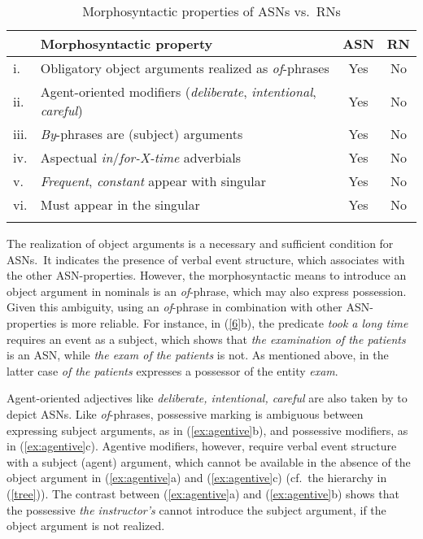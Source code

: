 \documentclass[output=paper]{langsci/langscibook}
\begin{document}
\begin{table}
\caption{Morphosyntactic properties of ASNs vs.\ RNs\label{tab:1:ASN:RN}}
\begin{tabular}{llcc}
\lsptoprule
& Morphosyntactic property & ASN & RN\\\midrule
i. & Obligatory object arguments realized as \textit{of}-phrases & Yes & No \\ 
ii. & Agent-oriented modifiers (\textit{deliberate}, \textit{intentional}, \textit{careful}) & Yes & No\\ 
iii. & \textit{By}-phrases are (subject) arguments &Yes & No\\ 
iv. & Aspectual \textit{in}/\textit{for-X-time} adverbials & Yes & No\\ 
v. &  \textit{Frequent}, \textit{constant} appear with singular & Yes & No\\ 
vi. & Must appear in the singular & Yes & No\\
\lspbottomrule
\end{tabular}
\end{table}

 The realization of object arguments is a necessary and sufficient condition for ASNs.\ It indicates the presence of verbal event structure, which associates with the other ASN-properties. However, the morphosyntactic means to introduce an object argument in nominals is an \textit{of}-phrase, which may also express possession. Given this ambiguity, using an  \textit{of}-phrase in combination with other ASN-properties is more reliable. For instance, in  (\ref{6}b), the predicate \textit{took a long time} requires an event as a subject, which shows that \textit{the examination of the patients} is an ASN, while \textit{the exam of the patients} is not.
As mentioned above, in the latter case \textit{of the patients} expresses a possessor of the entity \textit{exam}.

Agent-oriented adjectives like \textit{deliberate, intentional, careful} are also taken by \citet[51--52]{grimshaw:90} to depict ASNs.  Like \textit{of}-phrases, possessive marking is ambiguous between expressing subject arguments, as in (\ref{ex:agentive}b), and possessive modifiers,  as in (\ref{ex:agentive}c). Agentive modifiers, however, require verbal event structure with a subject (agent) argument, which cannot be available in the absence of the object argument in (\ref{ex:agentive}a) and (\ref{ex:agentive}c) (cf.~the hierarchy in (\ref{tree})). The contrast between (\ref{ex:agentive}a) and (\ref{ex:agentive}b) shows that the possessive \textit{the instructor's} cannot introduce the subject argument, if the object argument is not realized.
\end{document}
